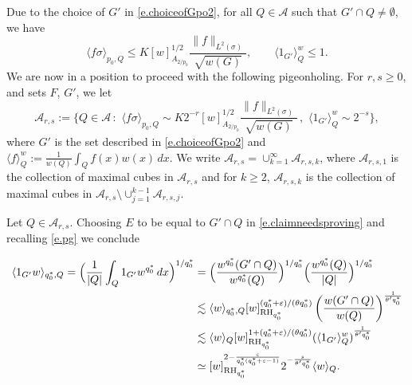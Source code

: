 \documentclass[11pt,reqno]{amsart}
\theoremstyle{plain} %
\newcommand{\1}{ \mathbbm{1}}   %
\theoremstyle{definition}
\theoremstyle{remark}
\numberwithin{equation}{section}
\begin{document}
Due to the choice of $G'$ in \eqref{e.choiceofGpo2}, for all $Q\in \mathcal A$ such that $G'\cap Q \neq \emptyset$, we have
$$
\langle f \sigma  \rangle_{p_0, Q}  \leq K[w]_{A_{2/p_0}}^{1/2}\frac{\|f\|_{L^{2}(\sigma)}}{\sqrt{w(G)}}, \qquad
\langle  1_{G'} \rangle_{Q}^w  \leq 1.
$$
We are now in a position to proceed with the following pigeonholing. For $r,s\geq 0$, and sets $F$, $G'$, we let
\begin{equation}\label{e.pg}
\mathcal A_{r,s}:= \bigg \{Q\in \mathcal A\,: \,\, \langle f\sigma  \rangle_{p_0, Q} \sim K 2^{-r}[w]_{A_{2/p_0}}^{1/2}\frac{\|f\|_{L^{2}(\sigma)}}{\sqrt{w(G)}}\, ,\,\,  \langle  1_{G'}\rangle_{Q}^w \sim 2^{-s} \bigg \},
\end{equation}
where $G'$ is the set described in \eqref{e.choiceofGpo2} and $\langle f\rangle_Q^w:=\frac{1}{w(Q)}\int_Qf(x)w(x)\,dx$. We write $\mathcal A_{r,s}= \cup_{k=1}^{\infty}  \mathcal A_{r,s,k}$, where
$ \mathcal A_{r,s,1}$ is the collection of maximal cubes in  $\mathcal A_{r,s}$ and for $k\geq 2$,  $ \mathcal A_{r,s,k}$  is the collection of maximal cubes in $\mathcal A_{r,s}\setminus \cup_{j=1}^{k-1} \mathcal A_{r,s,j}$.

Let $Q\in \mathcal{A}_{r,s}$. Choosing $E$ to be equal to $G'\cap Q$ in \eqref{e.claimneedsproving} and recalling \eqref{e.pg} we conclude

\begin{align}\label{e.compaverages}
\notag\langle 1_{G'} w \rangle_{q_0^*, Q}= \Big(\frac{1}{|Q|}\int_Q1_{G'}w^{q_0^*}\,dx\Big)^{1/q_0^*}&= \Big(\frac{w^{q_0^*}(G' \cap Q)}{w^{q_0^*}(Q)}\Big)^{1/q_0^*}\Big(\frac{w^{q_0^*}(Q)}{|Q|}\Big)^{1/q_0^*} \\
\notag&\lesssim  \langle w \rangle_{q_0^*, Q}[w]_{\operatorname{RH}_{q_0^*}}^{(q_0^*+\varepsilon)/(\theta q_0^*)} \left (\frac{w(G' \cap Q)}{w(Q)}\right )^{\frac{1}{\theta'q_0^*}}\\
\notag&\lesssim  \langle w\rangle_Q [w]_{\operatorname{RH}_{q_0^*}}^{1+(q_0^*+\varepsilon )/(\theta q_0^*)}(\langle 1_{G'} \rangle_Q^w )^{\frac{1}{\theta'q_0^*}}\\
&\simeq   [w]_{\operatorname{RH}_{q_0^*}}^{2-\frac{\varepsilon}{q_0^*(q_0^*+\varepsilon-1)}}2^{-\frac{s}{\theta'q_0^*}}\langle w\rangle_Q.
\end{align}

\color{black}
\end{document}
